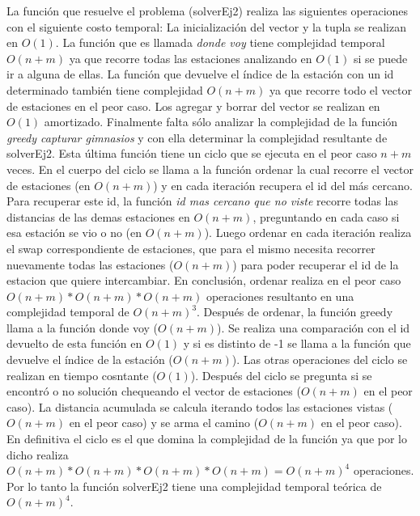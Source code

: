       La función que resuelve el problema (solverEj2) realiza las siguientes operaciones con el siguiente costo temporal: La inicialización del vector y la tupla se realizan en $O(1)$. La función que es llamada \textit{donde voy} tiene complejidad temporal $O(n+m)$ ya que recorre todas las estaciones analizando en $O(1)$ si se puede ir a alguna de ellas. La función que devuelve el índice de la estación con un id determinado también tiene complejidad $O(n+m)$ ya que recorre todo el vector de estaciones en el peor caso. Los agregar y borrar del vector se realizan en $O(1)$ amortizado. Finalmente falta sólo analizar la complejidad de la función \textit{greedy capturar gimnasios} y con ella determinar la complejidad resultante de solverEj2. 
      Esta última función tiene un ciclo que se ejecuta en el peor caso $n+m$ veces. En el cuerpo del ciclo se llama a la función ordenar la cual recorre el vector de estaciones (en $O(n+m)$) y en cada iteración recupera el id del más cercano. Para recuperar este id, la función \textit{id mas cercano que no viste} recorre todas las distancias de las demas estaciones en $O(n+m)$, preguntando en cada caso si esa estación se vio o no (en $O(n+m)$). Luego ordenar en cada iteración realiza el swap correspondiente de estaciones, que para el mismo necesita recorrer nuevamente todas las estaciones ($O(n+m)$) para poder recuperar el id de la estacion que quiere intercambiar. En conclusión, ordenar realiza en el peor caso $O(n+m)*O(n+m)*O(n+m)$ operaciones resultanto en una complejidad temporal de $O(n+m)^3$. 
      Después de ordenar, la función greedy llama a la función donde voy ($O(n+m)$). Se realiza una comparación con el id devuelto de esta función en $O(1)$ y si es distinto de -1 se llama a la función que devuelve el índice de la estación ($O(n+m)$). Las otras operaciones del ciclo se realizan en tiempo cosntante ($O(1)$). 
      Después del ciclo se pregunta si se encontró o no solución chequeando el vector de estaciones ($O(n+m)$ en el peor caso). La distancia acumulada se calcula iterando todos las estaciones vistas ($O(n+m)$ en el peor caso) y se arma el camino ($O(n+m)$ en el peor caso). En definitiva el ciclo es el que domina la complejidad de la función ya que por lo dicho realiza $O(n+m)*O(n+m)*O(n+m)*O(n+m) = O(n+m)^4$ operaciones.
      Por lo tanto la función solverEj2 tiene una complejidad temporal teórica de $O(n+m)^4$. 

